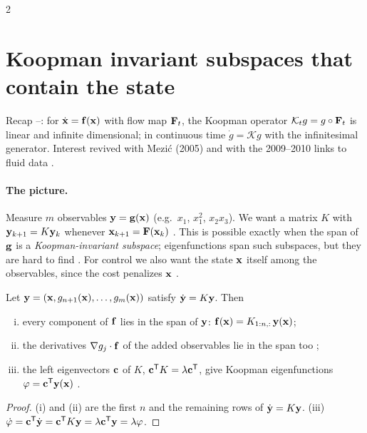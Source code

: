 \begin{paracol}{2}
\section{Koopman invariant subspaces that contain the state}\label{sec:kc-subspaces}

Recap --: for $\dot{\mathbf{x}}=\mathbf{f}(\mathbf{x})$ with flow map $\mathbf{F}_t$, the Koopman operator
$\mathcal{K}_tg=g\circ\mathbf{F}_t$ is linear and infinite dimensional; in continuous time $\dot g=\mathcal Kg$ with the
infinitesimal generator. Interest revived with Mezi\'c (2005) and with the 2009--2010 links to fluid data
.

\paragraph{The picture.} Measure $m$ observables $\mathbf{y}=\mathbf{g}(\mathbf{x})$ (e.g.\ $x_1$, $x_1^2$, $x_2x_3$). We want a
matrix $K$ with $\mathbf{y}_{k+1}=K\mathbf{y}_k$ whenever $\mathbf{x}_{k+1}=\mathbf{F}(\mathbf{x}_k)$ . This is
possible exactly when the span of $\mathbf{g}$ is a \emph{Koopman-invariant subspace}; eigenfunctions span such
subspaces, but they are hard to find . For control we also want the state
$\mathbf{x}$ itself among the observables, since the cost penalizes $\mathbf{x}$ .

\begin{proposition}\label{prop:kc-closure}
Let $\mathbf{y}=(\mathbf{x},g_{n+1}(\mathbf{x}),\dots,g_m(\mathbf{x}))$ satisfy $\dot{\mathbf{y}}=K\mathbf{y}$. Then
\begin{enumerate}[(i)]
  \item every component of $\mathbf{f}$ lies in the span of $\mathbf{y}$: $\mathbf{f}(\mathbf{x})=K_{1:n,:}\,\mathbf{y}(\mathbf{x})$;
  \item the derivatives $\nabla g_j\cdot\mathbf{f}$ of the added observables lie in the span too
        ;
  \item the left eigenvectors $\mathbf{c}$ of $K$, $\mathbf{c}^{\mathsf T}K=\lambda\mathbf{c}^{\mathsf T}$, give Koopman
        eigenfunctions $\varphi=\mathbf{c}^{\mathsf T}\mathbf{y}(\mathbf{x})$ .
\end{enumerate}
\end{proposition}
\begin{proof}
(i) and (ii) are the first $n$ and the remaining rows of $\dot{\mathbf{y}}=K\mathbf{y}$. (iii)
$\dot\varphi=\mathbf{c}^{\mathsf T}\dot{\mathbf{y}}=\mathbf{c}^{\mathsf T}K\mathbf{y}=\lambda\mathbf{c}^{\mathsf T}\mathbf{y}=\lambda\varphi$.
\end{proof}


\end{paracol}
